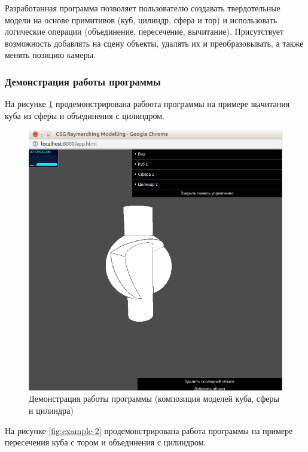 Разработанная программа позволяет пользователю создавать твердотельные модели на основе примитивов (куб, цилиндр, сфера и тор) и использовать логические операции (объединение, пересечение, вычитание). Присутствует возможность добавлять на сцену объекты, удалять их и преобразовывать, а также менять позицию камеры.

\subsubsection{Демонстрация работы программы}

На рисунке \ref{fig:example-1} продемонстрирована рабоота программы на примере вычитания куба из сферы и объединения с цилиндром.

\begin{figure}[h]
	\centering
	\captionsetup{justification=centering}
	\includegraphics[width=138mm]{img/example-1.png}
	\caption{Демонстрация  работы  программы  (композиция  моделей 
		куба, сферы и цилиндра)}
	\label{fig:example-1}
\end{figure}
\clearpage

На рисунке \ref{fig:example-2} продемонстрирована работа программы на примере пересечения куба с тором и объединения с цилиндром.

